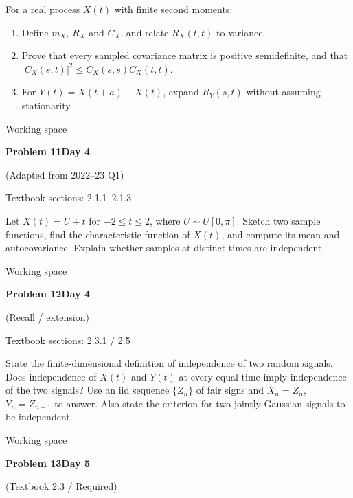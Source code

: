\documentclass[11pt]{article}
\newcommand{\qtitle}[2]{\clearpage\begin{tcolorbox}[colback=navy,colframe=navy,arc=1.5pt,boxrule=0pt]\color{white}\large\bfseries #1\hfill\small #2\end{tcolorbox}}
\begin{document}
\begin{tcolorbox}[colback=qbg,colframe=qbg,boxrule=0pt]For a real process $X(t)$ with finite second moments:
\begin{enumerate}\item Define $m_X$, $R_X$ and $C_X$, and relate $R_X(t,t)$ to variance.\item Prove that every sampled covariance matrix is positive semidefinite, and that $|C_X(s,t)|^2\le C_X(s,s)C_X(t,t)$.\item For $Y(t)=X(t+a)-X(t)$, expand $R_Y(s,t)$ without assuming stationarity.\end{enumerate}
\end{tcolorbox}\smallskip\begin{workspace}\hfill{\color{linec}\footnotesize Working space}\end{workspace}
\qtitle{Problem 11}{Day 4}
{\small\color{accentred}(Adapted from 2022--23 Q1)}\par\smallskip
{\small\color{muted}Textbook sections: 2.1.1--2.1.3}\par\medskip
\begin{tcolorbox}[colback=qbg,colframe=qbg,boxrule=0pt]Let $X(t)=U+t$ for $-2\le t\le2$, where $U\sim U[0,\pi]$.
Sketch two sample functions, find the characteristic function of $X(t)$, and compute its mean and autocovariance. Explain whether samples at distinct times are independent.
\end{tcolorbox}\smallskip\begin{workspace}\hfill{\color{linec}\footnotesize Working space}\end{workspace}
\qtitle{Problem 12}{Day 4}
{\small\color{accentred}(Recall / extension)}\par\smallskip
{\small\color{muted}Textbook sections: 2.3.1 / 2.5}\par\medskip
\begin{tcolorbox}[colback=qbg,colframe=qbg,boxrule=0pt]State the finite-dimensional definition of independence of two random signals. Does independence of $X(t)$ and $Y(t)$ at every equal time imply independence of the two signals?
Use an iid sequence $\{Z_n\}$ of fair signs and $X_n=Z_n$, $Y_n=Z_{n-1}$ to answer. Also state the criterion for two jointly Gaussian signals to be independent.
\end{tcolorbox}\smallskip\begin{workspace}\hfill{\color{linec}\footnotesize Working space}\end{workspace}
\qtitle{Problem 13}{Day 5}
{\small\color{accentred}(Textbook 2.3 / Required)}\par\smallskip
\end{document}
